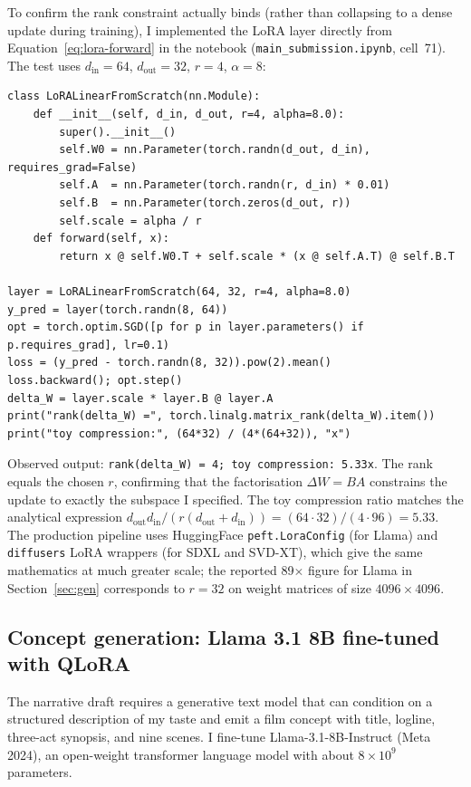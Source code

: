 \documentclass{article}
\begin{document}
To confirm the rank constraint actually binds (rather than collapsing to a dense update during training), I implemented the LoRA layer directly from Equation~\ref{eq:lora-forward} in the notebook (\texttt{main\_submission.ipynb}, cell~71). The test uses $d_\text{in}=64$, $d_\text{out}=32$, $r=4$, $\alpha=8$:

\begin{lstlisting}[caption={From-scratch LoRA layer; after one SGD step the effective rank of $\Delta W$ is checked against the bottleneck dimension $r$.}]
class LoRALinearFromScratch(nn.Module):
    def __init__(self, d_in, d_out, r=4, alpha=8.0):
        super().__init__()
        self.W0 = nn.Parameter(torch.randn(d_out, d_in), requires_grad=False)
        self.A  = nn.Parameter(torch.randn(r, d_in) * 0.01)
        self.B  = nn.Parameter(torch.zeros(d_out, r))
        self.scale = alpha / r
    def forward(self, x):
        return x @ self.W0.T + self.scale * (x @ self.A.T) @ self.B.T

layer = LoRALinearFromScratch(64, 32, r=4, alpha=8.0)
y_pred = layer(torch.randn(8, 64))
opt = torch.optim.SGD([p for p in layer.parameters() if p.requires_grad], lr=0.1)
loss = (y_pred - torch.randn(8, 32)).pow(2).mean()
loss.backward(); opt.step()
delta_W = layer.scale * layer.B @ layer.A
print("rank(delta_W) =", torch.linalg.matrix_rank(delta_W).item())
print("toy compression:", (64*32) / (4*(64+32)), "x")
\end{lstlisting}

\noindent Observed output: \texttt{rank(delta\_W) = 4; toy compression: 5.33x}. The rank equals the chosen $r$, confirming that the factorisation $\Delta W = BA$ constrains the update to exactly the subspace I specified. The toy compression ratio matches the analytical expression $d_\text{out} d_\text{in} / (r(d_\text{out} + d_\text{in})) = (64 \cdot 32) / (4 \cdot 96) = 5.33$. The production pipeline uses HuggingFace \texttt{peft.LoraConfig} (for Llama) and \texttt{diffusers} LoRA wrappers (for SDXL and SVD-XT), which give the same mathematics at much greater scale; the reported 89$\times$ figure for Llama in Section~\ref{sec:gen} corresponds to $r=32$ on weight matrices of size $4096 \times 4096$.

\subsection{Concept generation: Llama 3.1 8B fine-tuned with QLoRA}

The narrative draft requires a generative text model that can condition on a structured description of my taste and emit a film concept with title, logline, three-act synopsis, and nine scenes. I fine-tune Llama-3.1-8B-Instruct (Meta 2024), an open-weight transformer language model with about $8 \times 10^9$ parameters.
\end{document}
